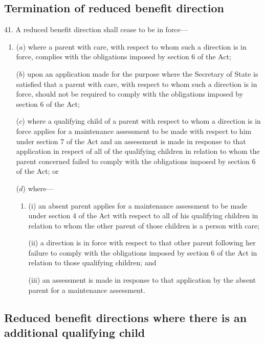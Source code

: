 \documentclass[a4paper,12pt]{article}
\begin{document}

\subsection[41. Termination of reduced benefit direction]{Termination of reduced benefit direction}

41.  A reduced benefit direction shall cease to be in force---
\begin{enumerate}\item[]
($a$) where a parent with care, with respect to whom such a direction is in force, complies with the obligations imposed by section 6 of the Act;

($b$) upon an application made for the purpose where the Secretary of State is satisfied that a parent with care, with respect to whom such a direction is in force, should not be required to comply with the obligations imposed by section 6 of the Act;

($c$) where a qualifying child of a parent with respect to whom a direction is in force applies for a maintenance assessment to be made with respect to him under section 7 of the Act and an assessment is made in response to that application in respect of all of the qualifying children in relation to whom the parent concerned failed to comply with the obligations imposed by section 6 of the Act; or

($d$) where---
\begin{enumerate}\item[]
(i) an absent parent applies for a maintenance assessment to be made under section 4 of the Act with respect to all of his qualifying children in relation to whom the other parent of those children is a person with care;

(ii) a direction is in force with respect to that other parent following her failure to comply with the obligations imposed by section 6 of the Act in relation to those qualifying children; and

(iii) an assessment is made in response to that application by the absent parent for a maintenance assessment.
\end{enumerate}
\end{enumerate}


\subsection[47. Reduced benefit directions where there is an additional qualifying child]{Reduced benefit directions where there is an additional qualifying child}
\end{document}
